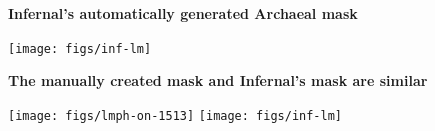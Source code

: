 \documentclass[landscape]{slides}
\begin{document}
\begin{slide}
\begin{center}
\textbf{Infernal's automatically generated Archaeal mask}
\end{center}
\small

\begin{center}
\texttt{[image: figs/inf-lm]}

\end{center}
\vfill
\end{slide}
\begin{slide}
\begin{center}
\textbf{The manually created mask and Infernal's mask are similar}
\end{center}
\small

\begin{center}
\texttt{[image: figs/lmph-on-1513]}
\texttt{[image: figs/inf-lm]}

\end{center}
\vfill
\end{slide}
\end{document}
